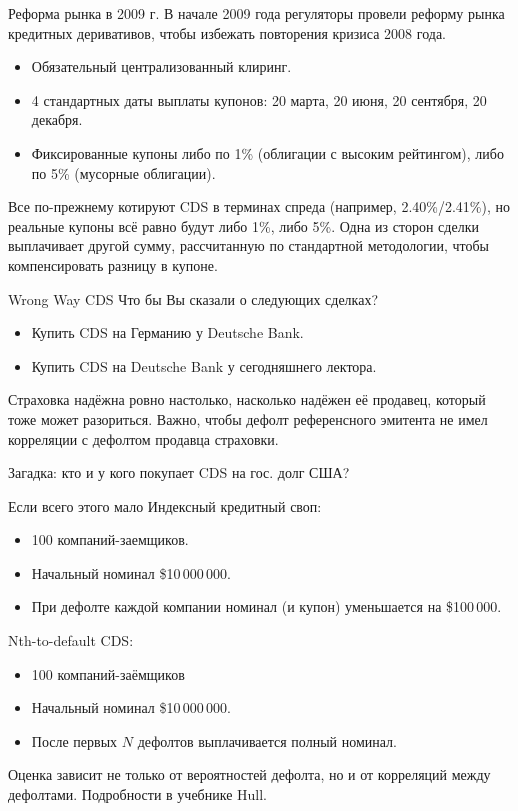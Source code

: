 \documentclass{beamer}
\begin{document}
\begin{frame}{Реформа рынка в 2009 г.}
\justify
В начале 2009 года регуляторы провели реформу рынка кредитных деривативов, чтобы избежать повторения кризиса 2008 года.

\begin{itemize}
\justifying
\item Обязательный централизованный клиринг.
\item 4 стандартных даты выплаты купонов: 20 марта, 20 июня, 20 сентября, 20 декабря.
\item Фиксированные купоны либо по 1\% (облигации с высоким рейтингом), либо по 5\% (мусорные облигации).
\end{itemize}

\justify
Все по-прежнему котируют CDS в терминах спреда (например, 2.40\%/2.41\%), но реальные купоны всё равно будут либо 1\%, либо 5\%. Одна из сторон сделки выплачивает другой сумму, рассчитанную по стандартной методологии, чтобы компенсировать разницу в купоне.
\end{frame}



\begin{frame}{Wrong Way CDS}
\justify
Что бы Вы сказали о следующих сделках?
\begin{itemize}
\item Купить CDS на Германию у Deutsche Bank.
\item Купить CDS на Deutsche Bank у сегодняшнего лектора.
\end{itemize}

\justify
Страховка надёжна ровно настолько, насколько надёжен её продавец, который тоже может разориться. Важно, чтобы дефолт референсного эмитента не имел корреляции с дефолтом продавца страховки.

\justify
Загадка: кто и у кого покупает CDS на гос. долг США?
\end{frame}



\begin{frame}{Если всего этого мало}
\justify
Индексный кредитный своп:
\begin{itemize}
\item 100 компаний-заемщиков.
\item Начальный номинал \$10\,000\,000.
\item При дефолте каждой компании номинал (и купон) уменьшается на \$100\,000.
\end{itemize}

Nth-to-default CDS:
\begin{itemize}
\item 100 компаний-заёмщиков
\item Начальный номинал \$10\,000\,000.
\item После первых $N$ дефолтов выплачивается полный номинал.
\end{itemize}
Оценка зависит не только от вероятностей дефолта, но и от корреляций между дефолтами. Подробности в учебнике Hull.
\end{frame}
\end{document}
